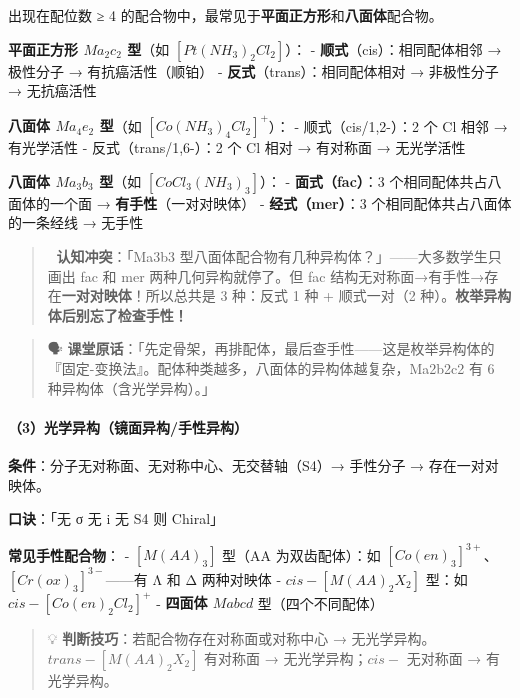 \documentclass[a4paper,11pt]{ctexart}
\begin{document}
出现在配位数 ≥ 4 的配合物中，最常见于\textbf{平面正方形}和\textbf{八面体}配合物。

\textbf{平面正方形 \(Ma_2c_2\) 型}（如 \([Pt(NH_3)_2Cl_2]\)）：
- \textbf{顺式}（cis）：相同配体相邻 → 极性分子 → 有抗癌活性（顺铂）
- \textbf{反式}（trans）：相同配体相对 → 非极性分子 → 无抗癌活性

\textbf{八面体 \(Ma_4e_2\) 型}（如 \([Co(NH_3)_4Cl_2]^+\)）：
- 顺式（cis/1,2-）：2 个 Cl 相邻 → 有光学活性
- 反式（trans/1,6-）：2 个 Cl 相对 → 有对称面 → 无光学活性

\textbf{八面体 \(Ma_3b_3\) 型}（如 \([CoCl_3(NH_3)_3]\)）：
- \textbf{面式（fac）}：3 个相同配体共占八面体的一个面 → \textbf{有手性}（一对对映体）
- \textbf{经式（mer）}：3 个相同配体共占八面体的一条经线 → 无手性

\begin{quote}
🧠 \textbf{认知冲突}：「Ma3b3 型八面体配合物有几种异构体？」------大多数学生只画出 fac 和 mer 两种几何异构就停了。但 fac 结构无对称面→有手性→存在\textbf{一对对映体}！所以总共是 3 种：反式 1 种 + 顺式一对（2 种）。\textbf{枚举异构体后别忘了检查手性！}
\end{quote}

\begin{quote}
🗣️ \textbf{课堂原话}：「先定骨架，再排配体，最后查手性------这是枚举异构体的『固定-变换法』。配体种类越多，八面体的异构体越复杂，Ma2b2c2 有 6 种异构体（含光学异构）。」
\end{quote}

\paragraph{（3）光学异构（镜面异构/手性异构）}\label{ux5149ux5b66ux5f02ux6784ux955cux9762ux5f02ux6784ux624bux6027ux5f02ux6784}

\textbf{条件}：分子无对称面、无对称中心、无交替轴（S4）→ 手性分子 → 存在一对对映体。

\textbf{口诀}：「无 σ 无 i 无 S4 则 Chiral」

\textbf{常见手性配合物}：
- \([M(AA)_3]\) 型（AA 为双齿配体）：如 \([Co(en)_3]^{3+}\)、\([Cr(ox)_3]^{3-}\)------有 Λ 和 Δ 两种对映体
- \(cis-[M(AA)_2X_2]\) 型：如 \(cis-[Co(en)_2Cl_2]^+\)
- \textbf{四面体 \(Mabcd\)} 型（四个不同配体）

\begin{quote}
💡 \textbf{判断技巧}：若配合物存在对称面或对称中心 → 无光学异构。\(trans-[M(AA)_2X_2]\) 有对称面 → 无光学异构；\(cis-\) 无对称面 → 有光学异构。
\end{quote}
\end{document}
